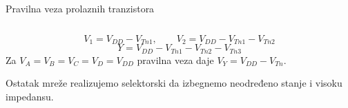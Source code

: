\begin{frame}[label=09_3-s055]{Pravilna veza prolaznih tranzistora}
\begin{columns}[c,onlytextwidth]
\begin{center}

\end{center}
\begin{center}

\end{center}
\end{columns}\[V_1=V_{DD}-V_{Tn1},\qquad V_2=V_{DD}-V_{Tn1}-V_{Tn2}\]\[Y=V_{DD}-V_{Tn1}-V_{Tn2}-V_{Tn3}\]\noindent Za $V_A=V_B=V_C=V_D=V_{DD}$ pravilna veza daje $V_Y=V_{DD}-V_{Tn}$.
\par Ostatak mreže realizujemo selektorski da izbegnemo neodređeno stanje i visoku impedansu.
\end{frame}
